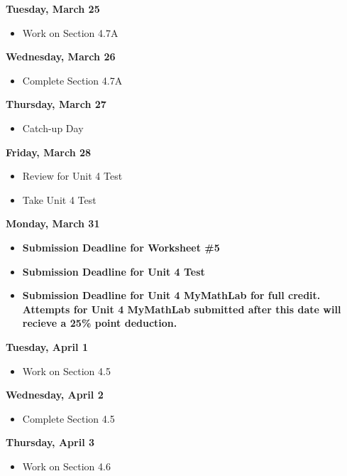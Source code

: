 \documentclass[11pt]{article}
\begin{document}
\textbf{Tuesday, March 25}

\begin{itemize}
\item Work on Section 4.7A
\end{itemize}

\textbf{Wednesday, March 26}

\begin{itemize}
\item Complete Section 4.7A
\end{itemize}

\textbf{Thursday, March 27}

\begin{itemize}
\item Catch-up Day
\end{itemize}

\textbf{Friday, March 28}

\begin{itemize}
\item Review for Unit 4 Test
\item Take Unit 4 Test
\end{itemize}

\textbf{Monday, March 31}

\begin{itemize}
\item \textbf{Submission Deadline for Worksheet \#5}
\item \textbf{Submission Deadline for Unit 4 Test}
\item \textbf{Submission Deadline for Unit 4 MyMathLab for full credit. Attempts for Unit 4 MyMathLab submitted after this date will recieve a 25\% point deduction.}
\end{itemize}

\textbf{Tuesday, April 1}

\begin{itemize}
\item Work on Section 4.5
\end{itemize}

\textbf{Wednesday, April 2}

\begin{itemize}
\item Complete Section 4.5
\end{itemize}

\textbf{Thursday, April 3}

\begin{itemize}
\item Work on Section 4.6
\end{itemize}
\end{document}
